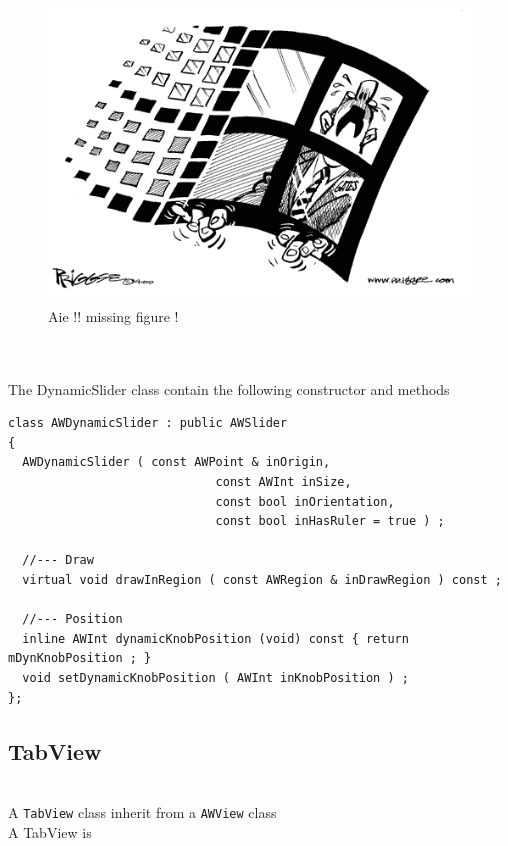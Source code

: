 \documentclass[a4paper,11pt]{extarticle}
\begin{document}
\begin{figure}[htbp]
   \centering
   \includegraphics[scale=0.55]{AWFig.png} 
   \caption{Aie !! missing figure !}
   \label{fig:13}
\end{figure}

~\\

~\\ The DynamicSlider class contain the following constructor and methods

\begin{lstlisting}[language=Arduinonl]
class AWDynamicSlider : public AWSlider
{
  AWDynamicSlider ( const AWPoint & inOrigin,
                             const AWInt inSize,
                             const bool inOrientation,
                             const bool inHasRuler = true ) ;
  
  //--- Draw
  virtual void drawInRegion ( const AWRegion & inDrawRegion ) const ;
  
  //--- Position
  inline AWInt dynamicKnobPosition (void) const { return mDynKnobPosition ; }
  void setDynamicKnobPosition ( AWInt inKnobPosition ) ;
};
\end{lstlisting}


\newpage
\subsection{TabView}

~\\ A \texttt{TabView} class inherit from a \texttt{AWView} class
~\\ A TabView is 
~\\
~\\
\end{document}

